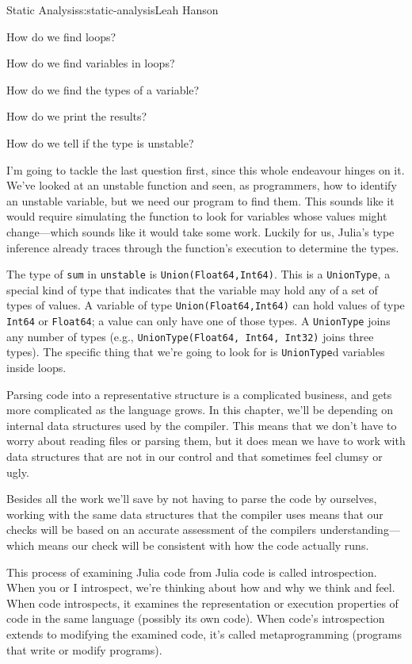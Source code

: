 \begin{aosachapter}{Static Analysis}{s:static-analysis}{Leah Hanson}
\begin{aosaitemize}

\item
  How do we find loops?
\item
  How do we find variables in loops?
\item
  How do we find the types of a variable?
\item
  How do we print the results?
\item
  How do we tell if the type is unstable?
\end{aosaitemize}

I'm going to tackle the last question first, since this whole endeavour
hinges on it. We've looked at an unstable function and seen, as
programmers, how to identify an unstable variable, but we need our
program to find them. This sounds like it would require simulating the
function to look for variables whose values might change---which sounds
like it would take some work. Luckily for us, Julia's type inference
already traces through the function's execution to determine the types.

The type of \texttt{sum} in \texttt{unstable} is
\texttt{Union(Float64,Int64)}. This is a \texttt{UnionType}, a special
kind of type that indicates that the variable may hold any of a set of
types of values. A variable of type \texttt{Union(Float64,Int64)} can
hold values of type \texttt{Int64} or \texttt{Float64}; a value can only
have one of those types. A \texttt{UnionType} joins any number of types
(e.g., \texttt{UnionType(Float64, Int64, Int32)} joins three types). The
specific thing that we're going to look for is \texttt{UnionType}d
variables inside loops.

Parsing code into a representative structure is a complicated business,
and gets more complicated as the language grows. In this chapter, we'll
be depending on internal data structures used by the compiler. This
means that we don't have to worry about reading files or parsing them,
but it does mean we have to work with data structures that are not in
our control and that sometimes feel clumsy or ugly.

Besides all the work we'll save by not having to parse the code by
ourselves, working with the same data structures that the compiler uses
means that our checks will be based on an accurate assessment of the
compilers understanding---which means our check will be consistent with
how the code actually runs.

This process of examining Julia code from Julia code is called
introspection. When you or I introspect, we're thinking about how and
why we think and feel. When code introspects, it examines the
representation or execution properties of code in the same language
(possibly its own code). When code's introspection extends to modifying
the examined code, it's called metaprogramming (programs that write or
modify programs).


\end{aosachapter}

